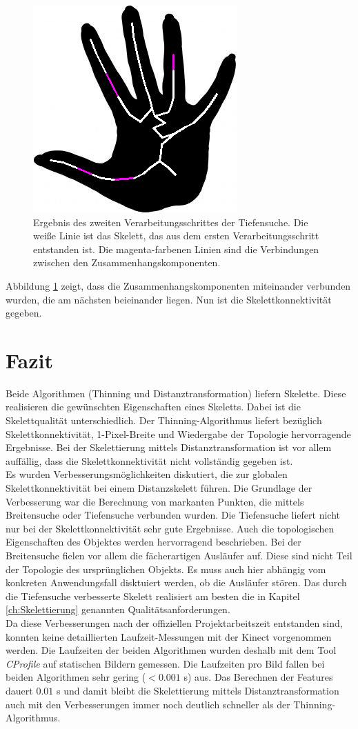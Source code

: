 \FloatBarrier
\begin{figure}[h]
\centering
\includegraphics[width=0.4\linewidth]{./fig/dfs-endergebnis-hand2.png}
\caption{Ergebnis des zweiten Verarbeitungsschrittes der Tiefensuche. Die weiße Linie ist das Skelett,
das aus dem ersten Verarbeitungsschritt entstanden ist. Die magenta-farbenen Linien sind die Verbindungen zwischen den Zusammenhangskomponenten.}
\label{fig:hand-DFS-endergebnis}
\end{figure}
\FloatBarrier
\noindent
Abbildung \ref{fig:hand-DFS-endergebnis} zeigt, dass die Zusammenhangskomponenten miteinander verbunden
wurden, die am nächsten beieinander liegen. Nun ist die Skelettkonnektivität gegeben.
\section{Fazit}
Beide Algorithmen (Thinning und Distanztransformation) liefern 
Skelette. Diese realisieren die gewünschten Eigenschaften eines
Skeletts. Dabei ist die Skelettqualität unterschiedlich. Der
Thinning-Algorithmus liefert bezüglich Skelettkonnektivität, 
1-Pixel-Breite und Wiedergabe der Topologie hervorragende Ergebnisse. Bei der Skelettierung mittels Distanztransformation
ist vor allem auffällig, dass die Skelettkonnektivität nicht vollständig gegeben ist. \\
Es wurden Verbesserungsmöglichkeiten diskutiert, die zur globalen Skelettkonnektivität bei einem Distanzskelett führen. Die Grundlage der
Verbesserung war die Berechnung von markanten Punkten, die mittels Breitensuche oder Tiefensuche verbunden wurden. Die Tiefensuche liefert nicht nur bei der Skelettkonnektivität sehr gute Ergebnisse. Auch die topologischen Eigenschaften des Objektes werden
hervorragend beschrieben. Bei der Breitensuche fielen vor allem die fächerartigen Ausläufer auf. Diese sind nicht Teil der Topologie
des ursprünglichen Objekts. Es muss auch hier abhängig vom konkreten Anwendungsfall disktuiert werden, ob die Ausläufer stören. Das durch die Tiefensuche verbesserte Skelett realisiert am besten die in Kapitel \ref{ch:Skelettierung} genannten Qualitätsanforderungen.\\ Da diese Verbesserungen nach der offiziellen Projektarbeitszeit entstanden sind, konnten keine detaillierten Laufzeit-Messungen mit der Kinect vorgenommen werden. Die Laufzeiten
der beiden Algorithmen wurden deshalb mit dem Tool \emph{CProfile} auf statischen Bildern gemessen. Die Laufzeiten pro Bild fallen bei beiden Algorithmen sehr gering ($<0.001$ s) aus. Das Berechnen der Features dauert $0.01$ s und damit bleibt die Skelettierung mittels Distanztransformation auch mit den Verbesserungen immer noch deutlich schneller als der Thinning-Algorithmus.